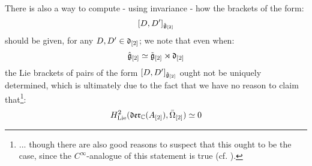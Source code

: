         \begin{remark} \label{remark: dual_of_toroidal_centres_contains_derivations}
            There is also a way to compute - using invariance - how the brackets of the form:
                $$[D, D']_{\hat{\mathfrak{g}}_{[2]}}$$
            should be given, for any $D, D' \in \mathfrak{d}_{[2]}$; we note that even when:
                $$\hat{\mathfrak{g}}_{[2]} \simeq \tilde{\mathfrak{g}}_{[2]} \rtimes \mathfrak{d}_{[2]}$$
            the Lie brackets of pairs of the form $[D, D']_{\hat{\mathfrak{g}}_{[2]}}$ ought not be uniquely determined, which is ultimately due to the fact that we have no reason to claim that\footnote{... though there are also good reasons to suspect that this ought to be the case, since the $C^{\infty}$-analogue of this statement is true (cf. \cite[Corollary D.3]{billig_neeb_vector_field_cyclic_cohomology_parallelisable_manifolds}).}:
                $$H^2_{\mathrm{Lie}}(\mathfrak{der}_{\mathbb{C}}(A_{[2]}), \bar{\Omega}_{[2]}) \simeq 0$$
                

\end{remark}

